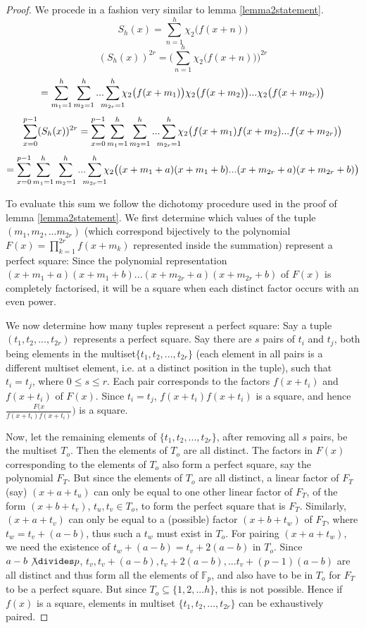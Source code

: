 \documentclass{report}
\begin{document}
\begin{proof}
We procede in a fashion very similar to lemma \ref{lemma2statement}.
\[S_h(x)=\sum\limits_{n=1}^{h} \chi_2\big(f(x+n)\big)\]
\[(S_h(x))^{2r}=\Bigg(\sum\limits_{n=1}^{h} \chi_2\big(f(x+n)\big)\Bigg)^{2r}\]
\[=\sum\limits_{m_1=1}^h\sum\limits_{m_2=1}^h...\sum\limits_{\mathclap{m_{2r}=1}}^h\chi_2\big(f(x+m_1)\big)\chi_2\big(f(x+m_2)\big)...\chi_2\big(f(x+m_{2r})\big)\]
\[\sum\limits_{x=0}^{p-1}(S_h(x))^{2r} = \sum\limits_{x=0}^{p-1}\sum\limits_{m_1=1}^h\sum\limits_{m_2=1}^h... \sum\limits_{\mathclap{m_{2r}=1}}^h\chi_2\big(f(x+m_1)f(x+m_2)...f(x+m_{2r})\big)\]
\[=\sum\limits_{x=0}^{p-1}\sum\limits_{m_1=1}^h\sum\limits_{m_2=1}^h... \sum\limits_{\mathclap{m_{2r}=1}}^h\chi_2\big((x+m_1+a)(x+m_1+b)...(x+m_{2r}+a)(x+m_{2r}+b)\big)\]


To evaluate this sum we follow the dichotomy procedure used in the proof of lemma \ref{lemma2statement}. We first determine which values of the tuple $(m_1, m_2,...m_{2r})$ (which correspond bijectively to the polynomial $F(x)=\prod_{k=1}^{2r}f(x+m_k)$ represented inside the summation) represent a perfect square: Since the polynomial representation $(x+m_1+a) (x+m_1+b) ... (x+m_{2r}+a) (x+m_{2r}+b)$ of $F(x)$ is completely factorised, it will be a square when each distinct factor occurs with an even power.

We now determine how many tuples represent a perfect square: Say a tuple $(t_1, t_2,...,t_{2r})$ represents a perfect square. Say there are $s$ pairs of $t_i$ and $t_j$, both being elements in the multiset\footnotemark $\{t_1, t_2,...,t_{2r}\}$ (each element in all pairs is a different multiset element, i.e. at a distinct position in the tuple), such that $t_i=t_j$, where $0\leq s\leq r$. Each pair corresponds to the factors $f(x+t_i)$ and $f(x+t_i)$ of $F(x)$. Since $t_i=t_j$, $f(x+t_i)f(x+t_i)$ is a square, and hence $\frac{F(x}{f(x+t_i)f(x+t_i)})$ is a square.

Now, let the remaining elements of $\{t_1, t_2,...,t_{2r}\}$, after removing all $s$ pairs, be the multiset $T_o$. Then the elements of $T_o$ are all distinct. The factors in $F(x)$ corresponding to the elements of $T_o$ also form a perfect square, say the polynomial $F_T$. But since the elements of $T_o$ are all distinct, a linear factor of $F_T$ (say) $(x+a+t_u)$ can only be equal to one other linear factor of $F_T$, of the form $(x+b+t_v)$, $t_u,t_v\in T_o$, to form the perfect square that is $F_T$.
Similarly, $(x+a+t_v)$ can only be equal to a (possible) factor $(x+b+t_w)$ of $F_T$, where $t_w=t_v+(a-b)$, thus such a $t_w$ must exist in $T_o$. For pairing $(x+a+t_w)$, we need the existence of $t_w+(a-b)=t_v+2(a-b)$ in $T_o$. Since $a-b \not\divides p$, $t_v, t_v+(a-b), t_v+2(a-b),...t_v+(p-1)(a-b)$ are all distinct and thus form all the elements of $\mathbb{F}_p$, and also have to be in $T_o$ for $F_T$ to be a perfect square. But since $T_o\subseteq \{1,2,...h\}$, this is not possible. Hence if $f(x)$ is a square, elements in multiset $\{t_1, t_2,...,t_{2r}\}$ can be exhaustively paired.


\end{proof}
\end{document}
